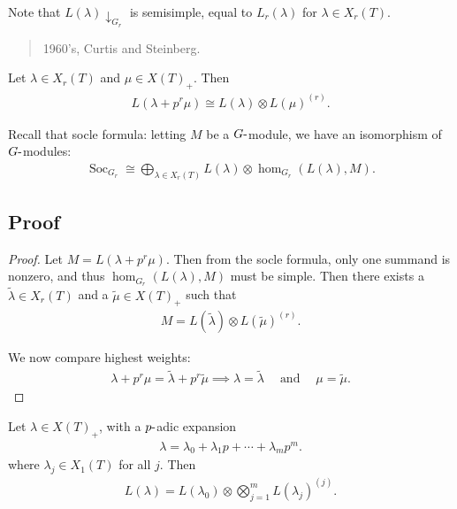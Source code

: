 Note that \(L(\lambda)\downarrow_{G_r}\) is semisimple, equal to
\(L_r(\lambda)\) for \(\lambda \in X_r(T)\).

\begin{quote}
1960's, Curtis and Steinberg.
\end{quote}

\begin{proposition}[?]

Let \(\lambda \in X_r(T)\) and \(\mu \in X(T)_+\). Then
\begin{align*}  
L(\lambda + p^r \mu) \cong L(\lambda) \otimes L(\mu)^{(r)}
.\end{align*}

\end{proposition}

Recall that socle formula: letting \(M\) be a \(G{\hbox{-}}\)module, we
have an isomorphism of \(G{\hbox{-}}\)modules:
\begin{align*} 
\operatorname{Soc}_{G_r} \cong \bigoplus_{\lambda \in X_r(T)} L(\lambda) \otimes\hom_{G_r}(L(\lambda), M)
.\end{align*}

\hypertarget{proof}{%
\subsection{Proof}\label{proof}}

\begin{proof}

Let \(M = L(\lambda + p^r \mu)\). Then from the socle formula, only one
summand is nonzero, and thus \(\hom_{G_r}(L(\lambda), M)\) must be
simple. Then there exists a \(\tilde \lambda \in X_r(T)\) and a
\(\tilde \mu \in X(T)_+\) such that
\begin{align*}  
M = L(\tilde \lambda) \otimes L(\tilde\mu)^{(r)}
.\end{align*}

We now compare highest weights:
\begin{align*}  
\lambda + p^r \mu = \tilde \lambda + p^r \tilde \mu \implies \lambda = \tilde \lambda {\quad \operatorname{and} \quad} \mu = \tilde \mu
.\end{align*}

\end{proof}

\begin{theorem}[Steinberg]

Let \(\lambda \in X(T)_+\), with a \(p{\hbox{-}}\)adic expansion
\begin{align*}  
\lambda = \lambda_0 + \lambda_1 p + \cdots + \lambda_m p^m
.\end{align*}
where \(\lambda_j \in X_1(T)\) for all \(j\). Then
\begin{align*}  
L(\lambda) = L(\lambda_0) \otimes\bigotimes_{j=1}^m L(\lambda_j)^{(j)}
.\end{align*}

\end{theorem}


